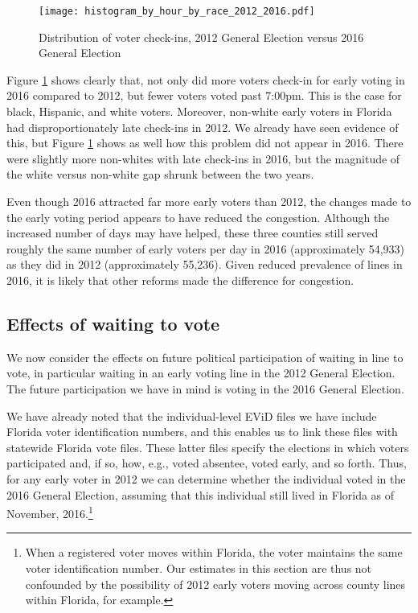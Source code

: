 \documentclass[12pt,titlepage]{article}
\begin{document}
\begin{figure}[!ht]
  \caption{Distribution of voter check-ins, 2012 General Election versus 2016 General Election}
  \label{fig:race2012and2016}
  \centering
  \centering\texttt{[image: histogram\_by\_hour\_by\_race\_2012\_2016.pdf]}
\end{figure}

Figure \ref{fig:race2012and2016} shows clearly that, not only did more
voters check-in for early voting in 2016 compared to 2012, but fewer
voters voted past 7:00pm.  This is the case for black, Hispanic, and
white voters. Moreover, non-white early voters in Florida had
disproportionately late check-ins in 2012.  We already have seen
evidence of this, but Figure \ref{fig:race2012and2016} shows as well
how this problem did not appear in 2016.  There were slightly more
non-whites with late check-ins in 2016, but the magnitude of the white
versus non-white gap shrunk between the two years.

Even though 2016 attracted far more early voters than 2012, the
changes made to the early voting period appears to have reduced the
congestion. Although the increased number of days may have helped,
these three counties still served roughly the same number of early
voters per day in 2016 (approximately 54,933) as they did in 2012
(approximately 55,236).  Given reduced prevalence of lines in 2016, it
is likely that other reforms made the difference for congestion.




\subsection*{Effects of waiting to vote}

We now consider the effects on future political participation of
waiting in line to vote, in particular waiting in an early voting line
in the 2012 General Election.  The future participation we have in
mind is voting in the 2016 General Election.

We have already noted that the individual-level EViD files we have
include Florida voter identification numbers, and this enables us to
link these files with statewide Florida vote files.  These latter
files specify the elections in which voters participated and, if so,
how, e.g., voted absentee, voted early, and so forth.  Thus, for any
early voter in 2012 we can determine whether the individual voted in
the 2016 General Election, assuming that this individual still lived
in Florida as of November, 2016.\footnote{When a registered voter
  moves within Florida, the voter maintains the same voter
  identification number.  Our estimates in this section are thus not
  confounded by the possibility of 2012 early voters moving across
  county lines within Florida, for example.}  
\end{document}
